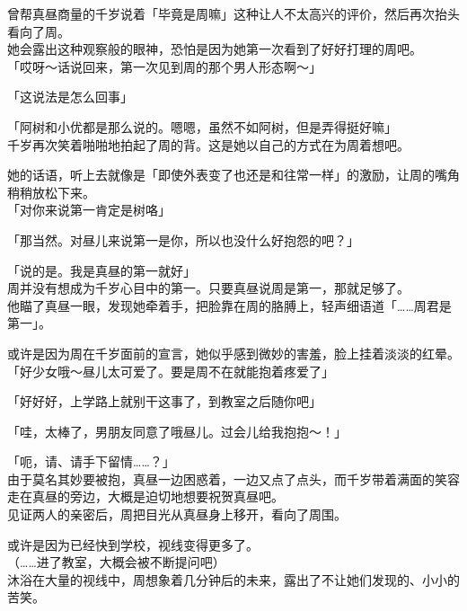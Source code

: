 曾帮真昼商量的千岁说着「毕竟是周嘛」这种让人不太高兴的评价，然后再次抬头看向了周。\\

她会露出这种观察般的眼神，恐怕是因为她第一次看到了好好打理的周吧。\\

「哎呀～话说回来，第一次见到周的那个男人形态啊～」

「这说法是怎么回事」

「阿树和小优都是那么说的。嗯嗯，虽然不如阿树，但是弄得挺好嘛」\\

千岁再次笑着啪啪地拍起了周的背。这是她以自己的方式在为周着想吧。

她的话语，听上去就像是「即使外表变了也还是和往常一样」的激励，让周的嘴角稍稍放松下来。\\

「对你来说第一肯定是树咯」

「那当然。对昼儿来说第一是你，所以也没什么好抱怨的吧？」

「说的是。我是真昼的第一就好」\\

周并没有想成为千岁心目中的第一。只要真昼说周是第一，那就足够了。\\

他瞄了真昼一眼，发现她牵着手，把脸靠在周的胳膊上，轻声细语道「……周君是第一」。

或许是因为周在千岁面前的宣言，她似乎感到微妙的害羞，脸上挂着淡淡的红晕。\\

「好少女哦～昼儿太可爱了。要是周不在就能抱着疼爱了」

「好好好，上学路上就别干这事了，到教室之后随你吧」

「哇，太棒了，男朋友同意了哦昼儿。过会儿给我抱抱～！」

「呃，请、请手下留情……？」\\

由于莫名其妙要被抱，真昼一边困惑着，一边又点了点头，而千岁带着满面的笑容走在真昼的旁边，大概是迫切地想要祝贺真昼吧。\\

见证两人的亲密后，周把目光从真昼身上移开，看向了周围。

或许是因为已经快到学校，视线变得更多了。\\

（……进了教室，大概会被不断提问吧）\\

沐浴在大量的视线中，周想象着几分钟后的未来，露出了不让她们发现的、小小的苦笑。
